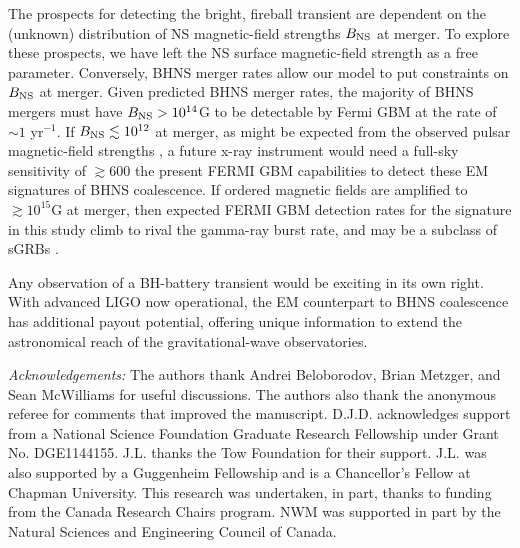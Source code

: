 The prospects for detecting the bright, fireball transient are
dependent on the (unknown) distribution of NS magnetic-field strengths
$B_{\rm{NS}}$ at merger. To explore these prospects, we have left the NS surface 
magnetic-field strength as a free parameter. Conversely, BHNS merger rates allow our model to put constraints on $B_{\rm{NS}}$ at merger. Given predicted BHNS merger rates, the majority of BHNS mergers must have $B_{\rm{NS}} > 10^{14}$G to be
detectable by Fermi GBM at the rate of $\sim 1$ yr$^{-1}$. If
$B_{\rm{NS}}\lesssim 10^{12}$ at merger, as might be expected from the
observed pulsar magnetic-field strengths \citep{PulsarsRev:1991}, a
future x-ray instrument would need a full-sky sensitivity of $\gtrsim
600$ the present FERMI GBM capabilities to detect these EM signatures
of BHNS coalescence. If ordered magnetic fields are amplified to
$\gtrsim 10^{15}$G at merger, then expected FERMI GBM detection rates
for the signature in this study climb to rival the gamma-ray burst
rate, and may be a subclass of sGRBs \citep{SWIFTsGRBrates:2012}.
 


Any observation of a BH-battery transient would be exciting in its own
right.  With advanced LIGO now operational, the EM counterpart to BHNS
coalescence has additional payout potential, offering unique
information to extend the astronomical reach of the gravitational-wave
observatories.





\textit{Acknowledgements:}  The authors thank Andrei Beloborodov, Brian Metzger,
and Sean McWilliams for useful discussions. The authors also thank the anonymous referee 
for comments that improved the manuscript.  D.J.D. acknowledges support
from a National Science Foundation Graduate Research Fellowship under
Grant No. DGE1144155.  J.L. thanks the Tow Foundation for their
support. J.L. was also supported by a Guggenheim Fellowship and is a
Chancellor's Fellow at Chapman University. This research was undertaken, in part, thanks to funding from the Canada Research Chairs program. NWM was supported in part by the Natural Sciences and Engineering Council of Canada.











































